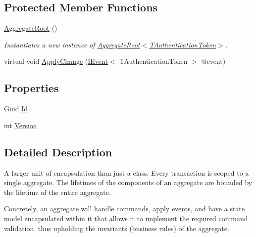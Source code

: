 \subsection*{Protected Member Functions}
\begin{DoxyCompactItemize}
\item 
\hyperlink{classCqrs_1_1Domain_1_1AggregateRoot_a1db2322dd7442e1e0c3c07332124eb2f_a1db2322dd7442e1e0c3c07332124eb2f}{Aggregate\+Root} ()
\begin{DoxyCompactList}\small\item\em Instantiates a new instance of \hyperlink{classCqrs_1_1Domain_1_1AggregateRoot_a1db2322dd7442e1e0c3c07332124eb2f_a1db2322dd7442e1e0c3c07332124eb2f}{Aggregate\+Root$<$\+T\+Authentication\+Token$>$}. \end{DoxyCompactList}\item 
virtual void \hyperlink{classCqrs_1_1Domain_1_1AggregateRoot_a7e299b13c7556731e52670aa6d782296_a7e299b13c7556731e52670aa6d782296}{Apply\+Change} (\hyperlink{interfaceCqrs_1_1Events_1_1IEvent}{I\+Event}$<$ T\+Authentication\+Token $>$ @event)
\end{DoxyCompactItemize}
\subsection*{Properties}
\begin{DoxyCompactItemize}
\item 
Guid \hyperlink{classCqrs_1_1Domain_1_1AggregateRoot_ab84d521c8c3bffd3c2e58959984d1e88_ab84d521c8c3bffd3c2e58959984d1e88}{Id}
\item 
int \hyperlink{classCqrs_1_1Domain_1_1AggregateRoot_a15f351663975c1d8e2cdc37b8c4d970f_a15f351663975c1d8e2cdc37b8c4d970f}{Version}
\end{DoxyCompactItemize}


\subsection{Detailed Description}
A larger unit of encapsulation than just a class. Every transaction is scoped to a single aggregate. The lifetimes of the components of an aggregate are bounded by the lifetime of the entire aggregate. 

Concretely, an aggregate will handle commands, apply events, and have a state model encapsulated within it that allows it to implement the required command validation, thus upholding the invariants (business rules) of the aggregate. 

